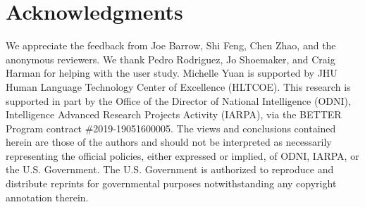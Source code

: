 \section*{Acknowledgments}

We appreciate the feedback from Joe Barrow, Shi Feng, Chen Zhao, and the anonymous reviewers.
We thank Pedro Rodriguez, Jo Shoemaker, and Craig Harman for helping with the user study.
Michelle Yuan is supported by JHU Human Language Technology Center of Excellence (HLTCOE).
This research is supported in part by the Office of the Director of National Intelligence (ODNI), Intelligence Advanced Research Projects Activity (IARPA), via the BETTER Program contract \#2019-19051600005. The views and conclusions contained herein are those of the authors and should not be interpreted as necessarily representing the official policies, either expressed or implied, of ODNI, IARPA, or the U.S. Government. The U.S. Government is authorized to reproduce and distribute reprints for governmental purposes notwithstanding any copyright annotation therein.
